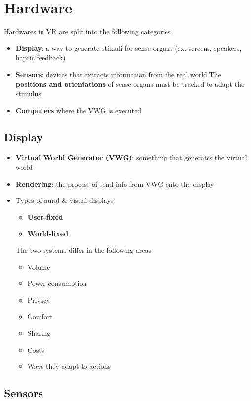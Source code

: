 \chapter{Hardware}

Hardwares in VR are split into the following categories

\begin{itemize}
  \item \textbf{Display}: a way to generate stimuli for sense organs
  (ex. screens, speakers, haptic feedback)
  \item \textbf{Sensors}: devices that extracts information from the real world
  The \textbf{positions and orientations} of sense organs must be tracked to
  adapt the stimulus
  \item \textbf{Computers} where the VWG is executed
\end{itemize}

\section{Display}

  \begin{itemize}
    \item \textbf{Virtual World Generator (VWG)}: something that generates the
    virtual world
    \item \textbf{Rendering}: the process of send info from VWG onto the
    display
    \item Types of aural \& visual displays
    \begin{itemize}
      \item \textbf{User-fixed}
      \item \textbf{World-fixed}
    \end{itemize}

    The two systems differ in the following areas
    \begin{itemize}
      \item Volume
      \item Power consumption
      \item Privacy
      \item Comfort
      \item Sharing
      \item Costs
      \item Ways they adapt to actions
    \end{itemize}
  \end{itemize}

\section{Sensors}

